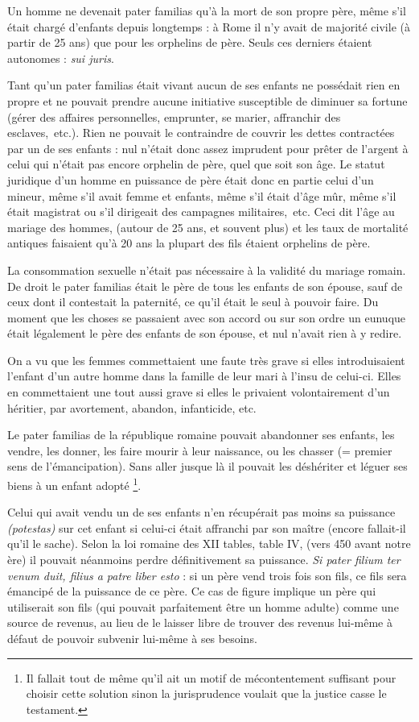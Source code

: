 Un homme ne devenait pater familias qu'à la mort de son propre
père, même s'il était chargé d'enfants depuis longtemps : à Rome il n'y
avait de majorité civile (à partir de 25 ans) que pour les orphelins de père.
Seuls ces derniers étaient autonomes : \emph{sui juris}.

Tant qu'un pater familias était vivant aucun de ses enfants ne possédait
rien en propre et ne pouvait prendre aucune initiative susceptible
de diminuer sa fortune (gérer des affaires personnelles, emprunter, se
marier, affranchir des esclaves,~etc.). Rien ne pouvait le contraindre de
couvrir les dettes contractées par un de ses enfants : nul n'était donc assez
imprudent pour prêter de l'argent à celui qui n'était pas encore orphelin
de père, quel que soit son âge. Le statut juridique d'un homme en
puissance de père était donc en partie celui d'un mineur, même s'il avait
femme et enfants, même s'il était d'âge mûr, même s'il était magistrat ou
s'il dirigeait des campagnes militaires,~etc. Ceci dit l'âge au mariage des
hommes, (autour de 25 ans, et souvent plus) et les taux de mortalité antiques
faisaient qu'à 20 ans la plupart des fils étaient orphelins de père.

La consommation sexuelle n'était pas nécessaire à la validité du
mariage romain. De droit le pater familias était le père de tous les enfants
de son épouse, sauf de ceux dont il contestait la paternité, ce qu'il était le
seul à pouvoir faire. Du moment que les choses se passaient avec son accord
ou sur son ordre un eunuque était légalement le père des enfants de
son épouse, et nul n'avait rien à y redire.

On a vu que les femmes commettaient une faute très grave si elles
introduisaient l'enfant d'un autre homme dans la famille de leur mari à
l'insu de celui-ci. Elles en commettaient une tout aussi grave si elles le
privaient volontairement d'un héritier, par avortement, abandon, infanticide,
etc.

Le pater familias de la république romaine pouvait abandonner ses
enfants, les vendre, les donner, les faire mourir à leur naissance, ou les
chasser (= premier sens de l'émancipation). Sans aller jusque là il pouvait
les déshériter et léguer ses biens à un enfant adopté%
\footnote{Il fallait tout de même qu'il ait un motif de mécontentement suffisant pour choisir cette solution sinon
la jurisprudence voulait que la justice casse le testament.}.

Celui qui avait vendu un de ses enfants n'en récupérait pas moins
sa puissance \emph{(potestas)} sur cet enfant si celui-ci était affranchi par son maître
(encore fallait-il qu'il le sache). Selon la loi romaine des XII tables, table
IV, (vers 450 avant notre ère) il pouvait néanmoins perdre définitivement
sa puissance. {\emph{Si pater filium ter venum duit, filius a patre liber esto}} :
si un père vend trois fois son fils, ce fils sera émancipé de la puissance de
ce père. Ce cas de figure implique un père qui utiliserait son fils (qui
pouvait parfaitement être un homme adulte) comme une source de revenus,
au lieu de le laisser libre de trouver des revenus lui-même à défaut
de pouvoir subvenir lui-même à ses besoins.

